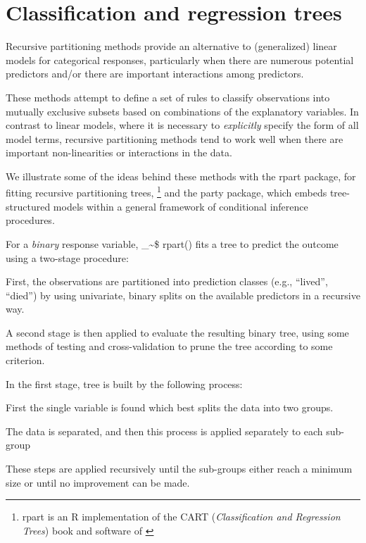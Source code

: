\documentclass{article}
\makeatletter
\newcommand\code{\bgroup\@makeother\_\@makeother\~\@makeother\$\@codex}
\def\@codex#1{{\normalfont\ttfamily\hyphenchar\font=-1 #1}\egroup}
\newcommand{\func}[1]{\code{#1()}}
\let\proglang=\textsf
\newcommand{\R}{\proglang{R}\xspace}
\newcommand{\pkg}[1]{\textsf{#1}\nocite{R-#1}}
\newcommand{\Rpackage}[1]{\pkg{#1} package}
\makeatother
\begin{document}





\section*{Classification and regression trees}

Recursive partitioning methods provide an alternative to (generalized) linear
models for categorical responses, particularly when there are numerous
potential predictors and/or there are important interactions among predictors.

These methods attempt to define a set of rules to classify observations into
mutually exclusive subsets based on combinations of the explanatory variables.
In contrast to linear models, where it is necessary to \emph{explicitly}
specify the form of all model terms, recursive partitioning methods
tend to work well when there are important non-linearities or interactions
in the data.  

We illustrate some of the ideas behind these methods with
the \Rpackage{rpart}, for fitting recursive partitioning trees,%
\footnote{\pkg{rpart} is an \R implementation of the CART
(\emph{Classification and Regression Trees})
book and software of \citet{Breiman-etal:1984}}
and the
\Rpackage{party}, which embeds tree-structured models within a general
framework of conditional inference procedures.  

For a \emph{binary} response variable, \func{rpart} fits a tree to predict the
outcome using a two-stage procedure:  
\begin{enumerate*}
  \item First, the observations are partitioned
into prediction classes (e.g., ``lived'', ``died'') by using univariate, binary splits
on the available predictors in a recursive way.  

  \item A second stage is then applied to evaluate the resulting binary tree, using some
methods of testing and cross-validation to prune the tree according to some
criterion.
\end{enumerate*}

In the first stage, tree is built by the following process: 
\begin{itemize*}
  \item First the single variable is found which best splits the data into two groups.
  \item The data is separated, and then this process is applied separately to each sub-group
  \item These steps are applied recursively until the sub-groups either reach a minimum size or until no improvement can be
made.
\end{itemize*}
\end{document}
